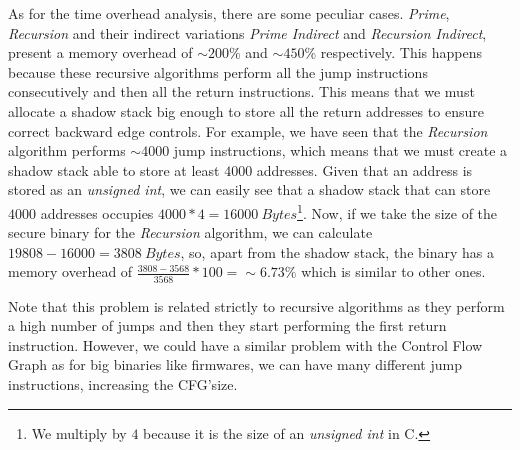 As for the time overhead analysis, there are some peculiar cases. \textit{Prime},
\textit{Recursion} and their indirect variations \textit{Prime Indirect} and \textit{Recursion
Indirect}, present a memory overhead of $\sim 200\%$ and $\sim 450\%$ respectively.
This happens because these recursive algorithms perform all the jump
instructions consecutively and then all the return instructions. This means that
we must allocate a shadow stack big enough to store all the return addresses to ensure
correct backward edge controls. For example, we have seen that the \textit{Recursion}
algorithm performs $\sim 4000$ jump instructions, which means that we must create
a shadow stack able to store at least $4000$ addresses. Given that an address is
stored as an \textit{unsigned int}, we can easily see that a shadow stack that
can store $4000$ addresses occupies $4000*4 = 16000 \ \textit{Bytes}$\footnote{We
multiply by $4$ because it is the size of an \textit{unsigned int} in C.}. Now, if
we take the size of the secure binary for the \textit{Recursion} algorithm, we can
calculate $19808 - 16000 = 3808 \ \textit{Bytes}$, so, apart from the shadow stack,
the binary has a memory overhead of $\frac{3808-3568}{3568}*100 = \sim 6. 73\%$
which is similar to other ones.

Note that this problem is related strictly to recursive algorithms as they
perform a high number of jumps and then they start performing the first return
instruction. However, we could have a similar problem with the Control Flow
Graph as for big binaries like firmwares, we can have many different jump instructions,
increasing the CFG'size.

